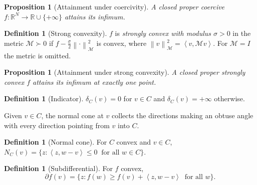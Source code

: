 \documentclass[a4paper,11pt]{book}
\theoremstyle{plain}
\newtheorem{proposition}[theorem]{Proposition}
\theoremstyle{definition}
\newtheorem{definition}[theorem]{Definition}
\theoremstyle{remark}
\numberwithin{equation}{chapter}
\numberwithin{algorithm}{chapter}
\newcommand{\R}{\mathbb{R}}
\newcommand{\norm}[1]{\left\|#1\right\|}
\newcommand{\inner}[2]{\left\langle #1, #2 \right\rangle}
\begin{document}
	
	\begin{proposition}[Attainment under coercivity]
		A closed proper coercive $f:\R^N\to\R\cup\{+\infty\}$ attains its infimum.
	\end{proposition}
	
	
	\begin{definition}[Strong convexity]
		$f$ is \emph{strongly convex with modulus $\sigma>0$} in the metric
		$\mathcal{M}\succ0$ if $f-\tfrac{\sigma}{2}\norm{\cdot}^2_{\mathcal{M}}$ is
		convex, where $\norm{v}^2_{\mathcal{M}}=\inner{v}{\mathcal{M}v}$. For
		$\mathcal{M}=I$ the metric is omitted.
	\end{definition}
	
	\begin{proposition}[Attainment under strong convexity]
		A closed proper strongly convex $f$ attains its infimum at exactly one point.
	\end{proposition}
	
	\begin{definition}[Indicator]
		$\delta_C(v)=0$ for $v\in C$ and $\delta_C(v)=+\infty$ otherwise.
	\end{definition}
	
	Given $v\in C$, the normal cone at $v$ collects the directions making an
	obtuse angle with every direction pointing from $v$ into $C$. 
	\begin{definition}[Normal cone]
		For $C$ convex and $v\in C$,
		$N_C(v)=\{z:\inner{z}{w-v}\leq0\ \text{ for all }w\in C\}$.
	\end{definition}
	
	\begin{definition}[Subdifferential]
		For $f$ convex,
		\begin{equation}
			\partial f(v)=\bigl\{z:f(w)\geq f(v)+\inner{z}{w-v}\ \text{ for all }w
			\bigr\} .
		\end{equation}
	\end{definition}
	
\end{document}
